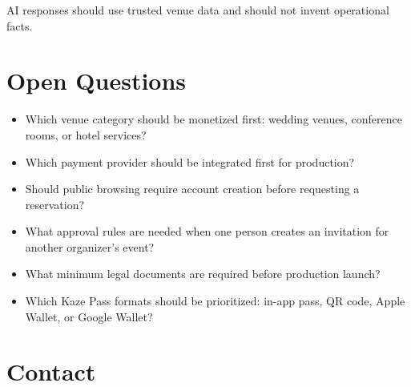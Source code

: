 \documentclass[11pt,a4paper]{article}
\begin{document}
AI responses should use trusted venue data and should not invent operational facts.

\section{Open Questions}

\begin{itemize}
    \item Which venue category should be monetized first: wedding venues, conference rooms, or hotel services?
    \item Which payment provider should be integrated first for production?
    \item Should public browsing require account creation before requesting a reservation?
    \item What approval rules are needed when one person creates an invitation for another organizer's event?
    \item What minimum legal documents are required before production launch?
    \item Which Kaze Pass formats should be prioritized: in-app pass, QR code, Apple Wallet, or Google Wallet?
\end{itemize}

\section{Contact}

\KazeContactBlock
\end{document}
